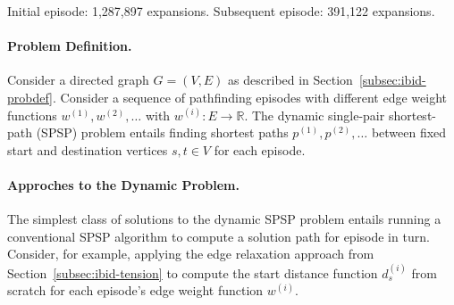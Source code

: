 
\begin{marginfigure}%
   \centering%
   
   \caption{Initial episode: 1,287,897 expansions.
      Subsequent episode: 391,122 expansions.}%
\end{marginfigure}

\paragraph{Problem Definition.}
Consider a directed graph $G = (V,E)$ as described in
Section~\ref{subsec:ibid-probdef}.
Consider a sequence of pathfinding episodes
with different edge weight functions $w^{(1)}, w^{(2)}, \dots$
with $w^{(i)} : E \rightarrow \mathbb{R}$.
The dynamic single-pair shortest-path (SPSP) problem
entails finding shortest paths $p^{(1)}, p^{(2)}, \dots$
between fixed start and destination vertices $s,t \in V$
for each episode.

\paragraph{Approches to the Dynamic Problem.}
The simplest class of solutions to the dynamic SPSP problem
entails running a conventional SPSP algorithm to compute a solution
path for episode in turn.
Consider, for example, applying the edge relaxation approach
from Section~\ref{subsec:ibid-tension}
to compute the start distance function $d_s^{(i)}$ from scratch
for each episode's edge weight function $w^{(i)}$.

